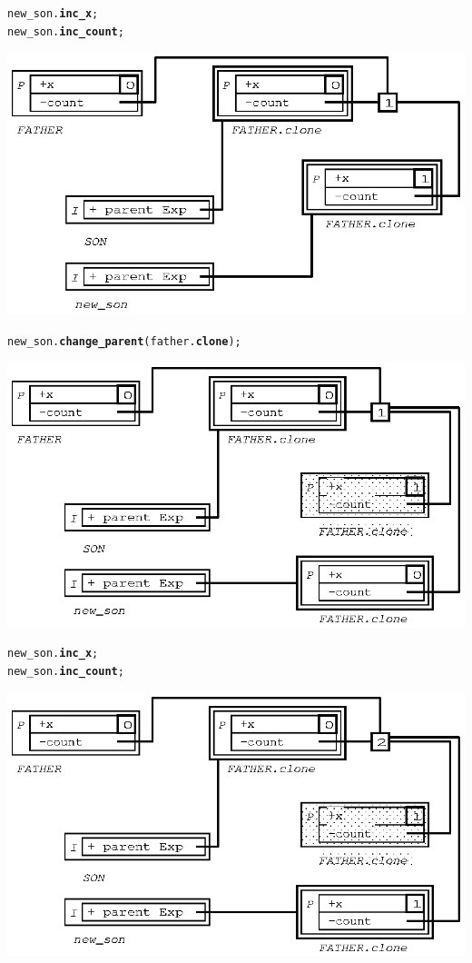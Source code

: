 \documentclass[11pt]{mybook}
\begin{document}
\begin{alltt}
  new\_son.{\bf{}inc\_x};
  new\_son.{\bf{}inc\_count};
\end{alltt}
\begin{center}
\includegraphics[scale=1.0]{figures/inherit_expanded_2} 
\end{center}

\begin{alltt}
  new\_son.{\bf{}change\_parent} ({\sc{}father}.{\bf{}clone});
\end{alltt}
\begin{center}
\includegraphics[scale=1.0]{figures/inherit_expanded_3} 
\end{center}

\begin{alltt}
  new\_son.{\bf{}inc\_x};
  new\_son.{\bf{}inc\_count};
\end{alltt}
\begin{center}
\includegraphics[scale=1.0]{figures/inherit_expanded_4} 
\end{center}
\end{document}
